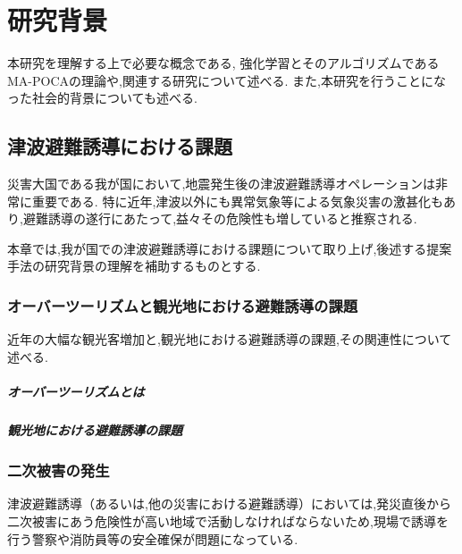 \chapter{研究背景}
本研究を理解する上で必要な概念である, 強化学習とそのアルゴリズムであるMA-POCAの理論や,関連する研究について述べる.
また,本研究を行うことになった社会的背景についても述べる.

\section{津波避難誘導における課題}
災害大国である我が国において,地震発生後の津波避難誘導オペレーションは非常に重要である.
特に近年,津波以外にも異常気象等による気象災害の激甚化もあり,避難誘導の遂行にあたって,益々その危険性も増していると推察される.\par 
本章では,我が国での津波避難誘導における課題について取り上げ,後述する提案手法の研究背景の理解を補助するものとする.
\subsection{オーバーツーリズムと観光地における避難誘導の課題}
近年の大幅な観光客増加と,観光地における避難誘導の課題,その関連性について述べる.
\paragraph{オーバーツーリズムとは}
\paragraph{観光地における避難誘導の課題}
\subsection{二次被害の発生}
津波避難誘導（あるいは,他の災害における避難誘導）においては,発災直後から二次被害にあう危険性が高い地域で活動しなければならないため,現場で誘導を行う警察や消防員等の安全確保が問題になっている.\par
